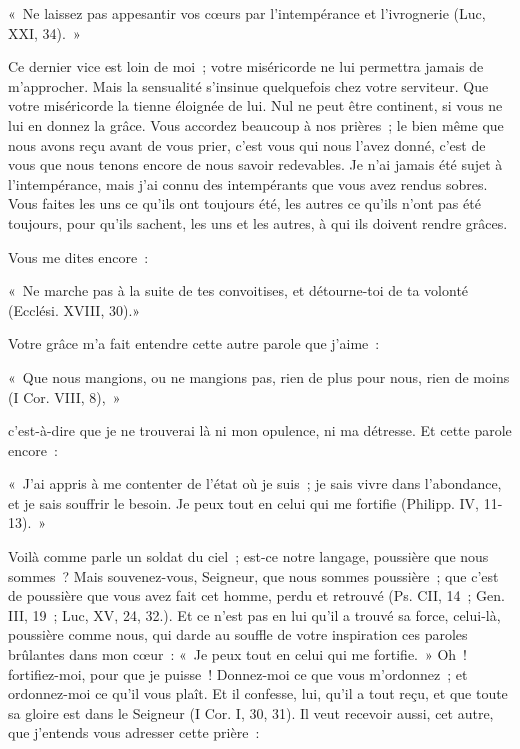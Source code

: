 \documentclass[french,twoside]{book} %
\newenvironment{quoteblock}%
  {\begin{quoting}}
  {\end{quoting}}
\newenvironment{quotebar}{%
    \def\FrameCommand{{\color{rubric!10!}\vrule width 0.5em} \hspace{0.9em}}%
    \def\OuterFrameSep{\itemsep} %
    \MakeFramed {\advance\hsize-\width \FrameRestore}
  }%
  {%
    \endMakeFramed
  }
\renewenvironment{quoteblock}%
  {%
    \savenotes
    \setstretch{0.9}
    \normalfont
    \begin{quotebar}
  }
  {%
    \end{quotebar}
    \spewnotes
  }
\begin{document}
\begin{quoteblock}
\noindent « Ne laissez pas appesantir vos cœurs par l’intempérance et l’ivrognerie (Luc, XXI, 34). »\end{quoteblock}

\noindent Ce dernier vice est loin de moi ; votre miséricorde ne lui permettra jamais de m’approcher. Mais la sensualité s’insinue quelquefois chez votre serviteur. Que votre miséricorde la tienne éloignée de lui. Nul ne peut être continent, si vous ne lui en donnez la grâce. Vous accordez beaucoup à nos prières ; le bien même que nous avons reçu avant de vous prier, c’est vous qui nous l’avez donné, c’est de vous que nous tenons encore de nous savoir redevables. Je n’ai jamais été sujet à l’intempérance, mais j’ai connu des intempérants que vous avez rendus sobres. Vous faites les uns ce qu’ils ont toujours été, les autres ce qu’ils n’ont pas été toujours, pour qu’ils sachent, les uns et les autres, à qui ils doivent rendre grâces.\par
Vous me dites encore :\par

\begin{quoteblock}
\noindent « Ne marche pas à la suite de tes convoitises, et détourne-toi de ta volonté (Ecclési. XVIII, 30).»\end{quoteblock}

\noindent Votre grâce m’a fait entendre cette autre parole que j’aime :\par

\begin{quoteblock}
\noindent « Que nous mangions, ou ne mangions pas, rien de plus pour nous, rien de moins (I Cor. VIII, 8), »\end{quoteblock}

\noindent c’est-à-dire que je ne trouverai là ni mon opulence, ni ma détresse. Et cette parole encore :\par

\begin{quoteblock}
\noindent « J’ai appris à me contenter de l’état où je suis ; je sais vivre dans l’abondance, et je sais souffrir le besoin. Je peux tout en celui qui me fortifie (Philipp. IV, 11-13). »\end{quoteblock}

\noindent Voilà comme parle un soldat du ciel ; est-ce notre langage, poussière que nous sommes ? Mais souvenez-vous, Seigneur, que nous sommes poussière ; que c’est de poussière que vous avez fait cet homme, perdu et retrouvé (Ps. CII, 14 ; Gen. III, 19 ; Luc, XV, 24, 32.). Et ce n’est pas en lui qu’il a trouvé sa force, celui-là, poussière comme nous, qui darde au souffle de votre inspiration ces paroles brûlantes dans mon cœur : « Je peux tout en celui qui me fortifie. » Oh ! fortifiez-moi, pour que je puisse ! Donnez-moi ce que vous m’ordonnez ; et ordonnez-moi ce qu’il vous plaît. Et il confesse, lui, qu’il a tout reçu, et que toute sa gloire est dans le Seigneur (I Cor. I, 30, 31). Il veut recevoir aussi, cet autre, que j’entends vous adresser cette prière :\par
\end{document}
